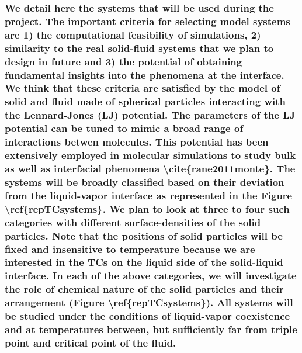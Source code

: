 \subsubsection{We detail here the systems that will be used during the project.  The important criteria for selecting model systems are 1) the computational feasibility of simulations, 2) similarity to the real solid-fluid systems that we plan to design in future and 3) the potential of obtaining fundamental insights into the phenomena at the interface. We think that these criteria are satisfied by the model of solid and fluid made of spherical particles interacting with the Lennard-Jones (LJ) potential. The parameters of the LJ potential can be tuned to mimic a broad range of interactions betwen molecules. This potential has been extensively employed in molecular simulations to study bulk as well as interfacial phenomena \textbackslash cite\{rane2011monte\}. The systems will be broadly classified based on their deviation from the liquid-vapor interface as represented in the Figure \textbackslash ref\{repTCsystems\}. We plan to look at three to four such categories with different surface-densities of the solid particles. Note that the positions of solid particles will be fixed and insensitive to temperature because we are interested in the TCs on the liquid side of the solid-liquid interface. In each of the above categories, we will investigate the role of chemical nature of the solid particles and their arrangement (Figure \textbackslash ref\{repTCsystems\}). All systems will be studied under the conditions of liquid-vapor coexistence and at temperatures between, but sufficiently far from triple point and critical point of the fluid.}

